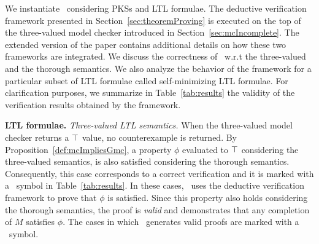 

We instantiate \NAME\ considering PKSs and LTL formulae.
The deductive verification framework presented in Section~\ref{sec:theoremProving} is executed on the top of the three-valued model checker introduced in Section~\ref{sec:mcIncomplete}.
The extended version of the paper contains additional details on how these two frameworks are integrated. 
We discuss the correctness of \NAME\ w.r.t the three-valued and the thorough semantics.
We also analyze the behavior of the framework for a particular subset of LTL formulae called self-minimizing LTL formulae.
For clarification purposes, we summarize in Table~\ref{tab:results} the validity of the verification results obtained by the framework.


%

\textbf{LTL formulae.} 
\emph{Three-valued LTL semantics.} 
When the three-valued model checker returns a $\operatorname{\top}$ value, no counterexample is returned.
By Proposition~\ref{def:mcImpliesGmc}, a property $\phi$  evaluated to $\operatorname{\top}$ considering the three-valued semantics, is also satisfied considering the thorough semantics.
Consequently, this case corresponds to a correct verification and it is marked with a \validCounterexample\ symbol in Table~\ref{tab:results}.
In these cases, \NAME\ uses the deductive verification framework to prove that $\phi$ is satisfied.
Since this property also holds considering the thorough semantics, the proof is \emph{valid} and demonstrates that any completion of $M$ satisfies $\phi$. 
The cases in which \NAME\ generates valid proofs are marked with a \validProof\ symbol.

